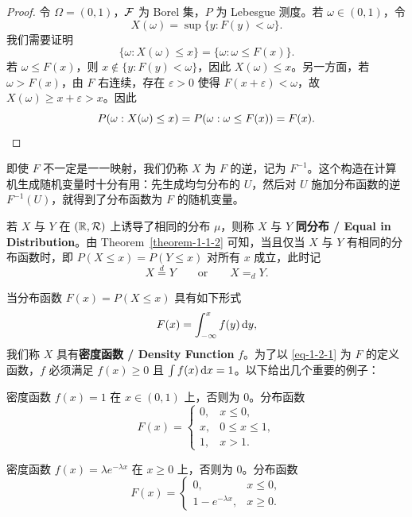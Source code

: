 \begin{proof}
    令 $\Omega = (0,1)$，$\mathcal{F}$ 为 Borel 集，$P$ 为 Lebesgue 测度。若 $\omega \in (0,1)$，令
    \[
        X(\omega) = \sup\{y : F(y) < \omega\}.
    \]
    我们需要证明
    \[
        \{\omega : X(\omega) \le x\} = \{\omega : \omega \le F(x)\}.
    \]
    若 $\omega \le F(x)$，则 $x \notin \{y : F(y) < \omega\}$，因此 $X(\omega) \le x$。另一方面，若 $\omega > F(x)$，由 $F$ 右连续，存在 $\varepsilon > 0$ 使得 $F(x + \varepsilon) < \omega$，故 $X(\omega) \ge x + \varepsilon > x$。因此
    \[
        P(\omega : X(\omega) \le x) = P(\omega : \omega \le F(x)) = F(x). \qedhere
    \]
\end{proof}

即使 $F$ 不一定是一一映射，我们仍称 $X$ 为 $F$ 的逆，记为 $F^{-1}$。这个构造在计算机生成随机变量时十分有用：先生成均匀分布的 $U$，然后对 $U$ 施加分布函数的逆 $F^{-1}(U)$，就得到了分布函数为 $F$ 的随机变量。

若 $X$ 与 $Y$ 在 $(\mathbb{R}, \mathcal{R})$ 上诱导了相同的分布 $\mu$，则称 $X$ 与 $Y$ {\normalfont\bfseries 同分布 / Equal in Distribution}。由 Theorem~\ref{theorem-1-1-2} 可知，当且仅当 $X$ 与 $Y$ 有相同的分布函数时，即 $P(X \le x) = P(Y \le x)$ 对所有 $x$ 成立，此时记
\[
    X \stackrel{d}{=} Y \qquad \text{or} \qquad X =_d Y.
\]

当分布函数 $F(x) = P(X \le x)$ 具有如下形式
\begin{equation}\label{eq-1-2-1}
    F(x) = \int_{-\infty}^x f(y) \,\mathrm{d} y,
\end{equation}
我们称 $X$ 具有{\normalfont\bfseries 密度函数 / Density Function} $f$。为了以 \eqref{eq-1-2-1} 为 $F$ 的定义函数，$f$ 必须满足 $f(x) \ge 0$ 且 $\int f(x) \,\mathrm{d} x = 1$。以下给出几个重要的例子：

\begin{example}
    密度函数 $f(x) = 1$ 在 $x \in (0,1)$ 上，否则为 $0$。分布函数
    \[
        F(x) =
        \begin{cases}
            0, & x \le 0,       \\
            x, & 0 \le x \le 1, \\
            1, & x > 1.
        \end{cases}
    \]
\end{example}

\begin{example}
    密度函数 $f(x) = \lambda e^{-\lambda x}$ 在 $x \ge 0$ 上，否则为 $0$。分布函数
    \[
        F(x) =
        \begin{cases}
            0,                  & x \le 0, \\
            1 - e^{-\lambda x}, & x \ge 0.
        \end{cases}
    \]
\end{example}

